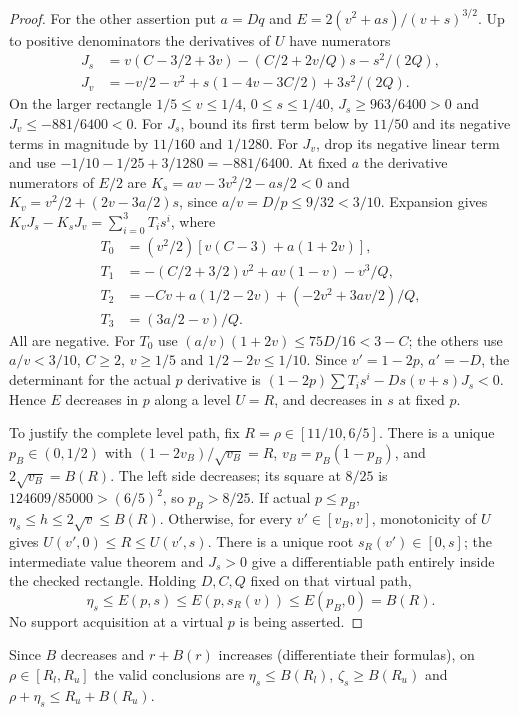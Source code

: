 \begin{proof}
For the other assertion put $a=Dq$ and $E=2(v^2+as)/(v+s)^{3/2}$.
Up to positive denominators the derivatives of $U$ have numerators
\begin{align*}
 J_s&=v(C-3/2+3v)-(C/2+2v/Q)s-s^2/(2Q),\\
 J_v&=-v/2-v^2+s(1-4v-3C/2)+3s^2/(2Q).
\end{align*}
On the larger rectangle $1/5\le v\le1/4$, $0\le s\le1/40$,
$J_s\ge963/6400>0$ and $J_v\le-881/6400<0$. For $J_s$, bound
its first term below by $11/50$ and its negative terms in magnitude
by $11/160$ and $1/1280$. For $J_v$, drop its negative linear term
and use $-1/10-1/25+3/1280=-881/6400$.
At fixed $a$ the derivative numerators of $E/2$ are
$K_s=av-3v^2/2-as/2<0$ and $K_v=v^2/2+(2v-3a/2)s$,
since $a/v=D/p\le9/32<3/10$. Expansion gives
$K_vJ_s-K_sJ_v=\sum_{i=0}^3T_i s^i$, where
\begin{align*}
 T_0&=(v^2/2)[v(C-3)+a(1+2v)],\\
 T_1&=-(C/2+3/2)v^2+av(1-v)-v^3/Q,\\
 T_2&=-Cv+a(1/2-2v)+(-2v^2+3av/2)/Q,\\
 T_3&=(3a/2-v)/Q.
\end{align*}
All are negative. For $T_0$ use
$(a/v)(1+2v)\le75D/16<3-C$; the others use $a/v<3/10$,
$C\ge2$, $v\ge1/5$ and $1/2-2v\le1/10$.
Since $v'=1-2p$, $a'=-D$, the determinant for the actual $p$
derivative is
$(1-2p)\sum T_i s^i-Ds(v+s)J_s<0$. Hence $E$ decreases in
$p$ along a level $U=R$, and decreases in $s$ at fixed $p$.

To justify the complete level path, fix $R=\rho\in[11/10,6/5]$.
There is a unique $p_B\in(0,1/2)$ with
$(1-2v_B)/\sqrt{v_B}=R$, $v_B=p_B(1-p_B)$, and
$2\sqrt{v_B}=B(R)$. The left side decreases; its square at $8/25$
is $124609/85000>(6/5)^2$, so $p_B>8/25$.
If actual $p\le p_B$, $\eta_s\le h\le2\sqrt v\le B(R)$.
Otherwise, for every $v'\in[v_B,v]$, monotonicity of $U$ gives
$U(v',0)\le R\le U(v',s)$. There is a unique root
$s_R(v')\in[0,s]$; the intermediate value theorem and $J_s>0$
give a differentiable path entirely inside the checked rectangle. Holding
$D,C,Q$ fixed on that virtual path,
\[
 \eta_s\le E(p,s)\le E(p,s_R(v))\le E(p_B,0)=B(R).
\]
No support acquisition at a virtual $p$ is being asserted.
\end{proof}
Since $B$ decreases and $r+B(r)$ increases (differentiate their formulas),
on $\rho\in[R_l,R_u]$ the valid conclusions are
$\eta_s\le B(R_l)$, $\zeta_s\ge B(R_u)$ and
$\rho+\eta_s\le R_u+B(R_u)$.

